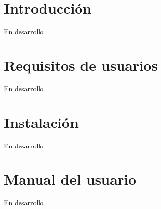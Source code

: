 
\section{Introducción}
En desarrollo
\section{Requisitos de usuarios}
En desarrollo
\section{Instalación}
En desarrollo
\section{Manual del usuario}
En desarrollo

